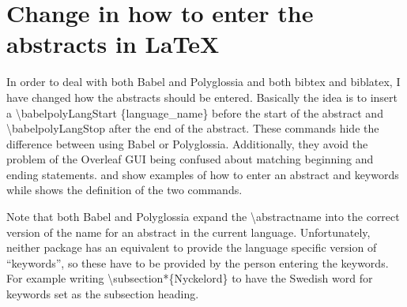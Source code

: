 \section{Change in how to enter the abstracts in \LaTeX}
In order to deal with both Babel and Polyglossia and both bibtex and biblatex, I have changed how the abstracts should be entered. Basically the idea is to insert a \textbackslash babelpolyLangStart \{language\_name\}  before the start of the abstract and \textbackslash babelpolyLangStop after the end of the abstract. These commands hide the difference between using Babel or Polyglossia. Additionally, they avoid the problem of the Overleaf GUI being confused about matching beginning and ending statements.  and  show examples of how to enter an abstract and keywords while  shows the definition of the two commands.

Note that both Babel and Polyglossia expand the \textbackslash abstractname into the correct version of the name for an abstract in the current language. Unfortunately, neither package has an equivalent to provide the language specific version of “keywords”, so these have to be provided by the person entering the keywords. For example writing \textbackslash subsection*\{Nyckelord\} to have the Swedish word for keywords set as the subsection heading.

